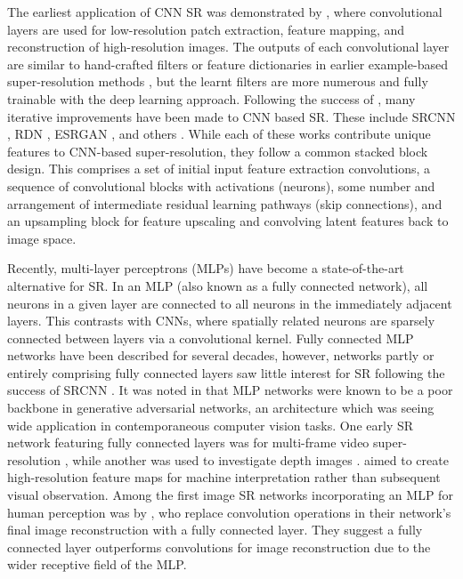 \documentclass[manuscript.tex]{subfiles}
\begin{document}
The earliest application of CNN SR was demonstrated by \parencite{dongLearningDeepConvolutional2014}, where convolutional layers are used for low-resolution patch extraction, feature mapping, and reconstruction of high-resolution images.
The outputs of each convolutional layer are similar to hand-crafted filters or feature dictionaries in earlier example-based super-resolution methods \parencite{freemanExamplebasedSuperresolution2002}, but the learnt filters are more numerous and fully trainable with the deep learning approach.
Following the success of \parencite{dongLearningDeepConvolutional2014}, many iterative improvements have been made to CNN based SR\@.
These include SRCNN \parencite{dongImageSuperresolutionUsing2016}, RDN \parencite{zhangResidualDenseNetwork2018}, ESRGAN \parencite{wangESRGANEnhancedSuperresolution2018}, and others \parencite{ledigPhotorealisticSingleImage2017,limEnhancedDeepResidual2017}.
While each of these works contribute unique features to CNN-based super-resolution, they follow a common stacked block design.
This comprises a set of initial input feature extraction convolutions, a sequence of convolutional blocks with activations (neurons), some number and arrangement of intermediate residual learning pathways (skip connections), and an upsampling block for feature upscaling and convolving latent features back to image space.

Recently, multi-layer perceptrons (MLPs) have become a state-of-the-art alternative for SR\@.
In an MLP (also known as a fully connected network), all neurons in a given layer are connected to all neurons in the immediately adjacent layers.
This contrasts with CNNs, where spatially related neurons are sparsely connected between layers via a convolutional kernel.
Fully connected MLP networks have been described for several decades, however, networks partly or entirely comprising fully connected layers saw little interest for SR following the success of SRCNN \parencite{dongLearningDeepConvolutional2014}.
It was noted in \parencite{arjovskyWassersteinGAN2017} that MLP networks were known to be a poor backbone in generative adversarial networks, an architecture which was seeing wide application in contemporaneous computer vision tasks.
One early SR network featuring fully connected layers was for multi-frame video super-resolution \parencite{chengFastVideoSuperresolution2012}, while another was used to investigate depth images \parencite{chenSingleDepthImage2018}.
\Textcite{tanFeatureSuperResolutionMake2018} aimed to create high-resolution feature maps for machine interpretation rather than subsequent visual observation.
Among the first image SR networks incorporating an MLP for human perception was by \parencite{tangDeepResidualNetworks2020}, who replace convolution operations in their network's final image reconstruction with a fully connected layer.
They suggest a fully connected layer outperforms convolutions for image reconstruction due to the wider receptive field of the MLP\@.
\end{document}
